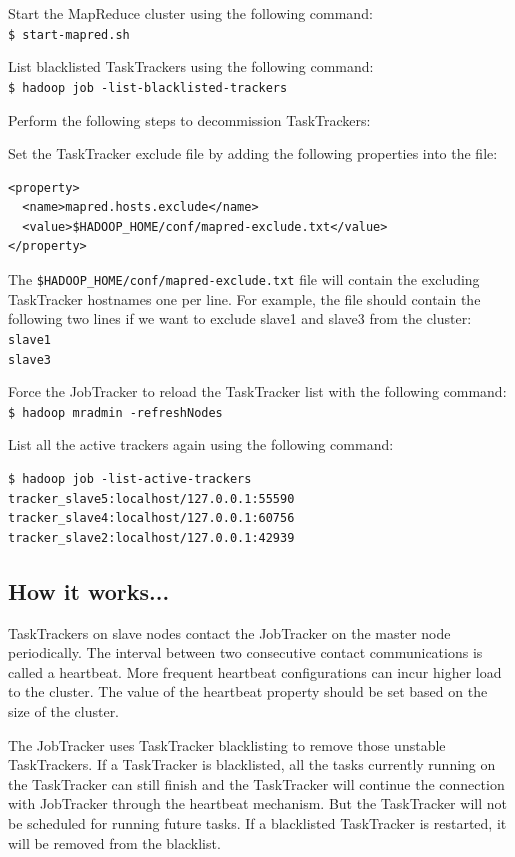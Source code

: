 Start the MapReduce cluster using the following command: \\
\verb|$ start-mapred.sh|

List blacklisted TaskTrackers using the following command: \\
\verb|$ hadoop job -list-blacklisted-trackers|

Perform the following steps to decommission TaskTrackers: 

Set the TaskTracker exclude file by adding the following properties into the file:
\begin{verbatim}
<property>
  <name>mapred.hosts.exclude</name>
  <value>$HADOOP_HOME/conf/mapred-exclude.txt</value>
</property>
\end{verbatim}

The \verb|$HADOOP_HOME/conf/mapred-exclude.txt| file will contain the excluding TaskTracker hostnames one per line. For example, the file should contain the following two lines if we want to exclude slave1 and slave3 from the cluster: \\
\verb|slave1| \\
\verb|slave3| 

Force the JobTracker to reload the TaskTracker list with the following command: \\
\verb|$ hadoop mradmin -refreshNodes|

List all the active trackers again using the following command:
\begin{verbatim}
$ hadoop job -list-active-trackers
tracker_slave5:localhost/127.0.0.1:55590
tracker_slave4:localhost/127.0.0.1:60756
tracker_slave2:localhost/127.0.0.1:42939
\end{verbatim}

\subsection*{How it works...}
TaskTrackers on slave nodes contact the JobTracker on the master node periodically. The interval between two consecutive contact communications is called a heartbeat. More frequent heartbeat configurations can incur higher load to the cluster. The value of the heartbeat property should be set based on the size of the cluster.

The JobTracker uses TaskTracker blacklisting to remove those unstable TaskTrackers. If a TaskTracker is blacklisted, all the tasks currently running on the TaskTracker can still finish and the TaskTracker will continue the connection with JobTracker through the heartbeat mechanism. But the TaskTracker will not be scheduled for running future tasks. If a blacklisted TaskTracker is restarted, it will be removed from the blacklist.

